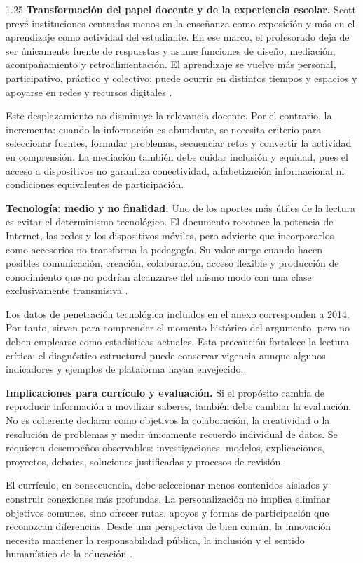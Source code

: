\documentclass[spanish,letterpaper,oneside]{article}
\begin{document}
\begin{reportelecturabox}
\begin{spacing}{1.25}
\medskip\noindent\textbf{Transformación del papel docente y de la experiencia escolar.}\enspace
Scott prevé instituciones centradas menos en la enseñanza como exposición y más en el aprendizaje como actividad del estudiante. En ese marco, el profesorado deja de ser únicamente fuente de respuestas y asume funciones de diseño, mediación, acompañamiento y retroalimentación. El aprendizaje se vuelve más personal, participativo, práctico y colectivo; puede ocurrir en distintos tiempos y espacios y apoyarse en redes y recursos digitales \citep{scott2015futuro}.

Este desplazamiento no disminuye la relevancia docente. Por el contrario, la incrementa: cuando la información es abundante, se necesita criterio para seleccionar fuentes, formular problemas, secuenciar retos y convertir la actividad en comprensión. La mediación también debe cuidar inclusión y equidad, pues el acceso a dispositivos no garantiza conectividad, alfabetización informacional ni condiciones equivalentes de participación.

\medskip\noindent\textbf{Tecnología: medio y no finalidad.}\enspace
Uno de los aportes más útiles de la lectura es evitar el determinismo tecnológico. El documento reconoce la potencia de Internet, las redes y los dispositivos móviles, pero advierte que incorporarlos como accesorios no transforma la pedagogía. Su valor surge cuando hacen posibles comunicación, creación, colaboración, acceso flexible y producción de conocimiento que no podrían alcanzarse del mismo modo con una clase exclusivamente transmisiva \citep{scott2015futuro}.

Los datos de penetración tecnológica incluidos en el anexo corresponden a 2014. Por tanto, sirven para comprender el momento histórico del argumento, pero no deben emplearse como estadísticas actuales. Esta precaución fortalece la lectura crítica: el diagnóstico estructural puede conservar vigencia aunque algunos indicadores y ejemplos de plataforma hayan envejecido.

\medskip\noindent\textbf{Implicaciones para currículo y evaluación.}\enspace
Si el propósito cambia de reproducir información a movilizar saberes, también debe cambiar la evaluación. No es coherente declarar como objetivos la colaboración, la creatividad o la resolución de problemas y medir únicamente recuerdo individual de datos. Se requieren desempeños observables: investigaciones, modelos, explicaciones, proyectos, debates, soluciones justificadas y procesos de revisión.

El currículo, en consecuencia, debe seleccionar menos contenidos aislados y construir conexiones más profundas. La personalización no implica eliminar objetivos comunes, sino ofrecer rutas, apoyos y formas de participación que reconozcan diferencias. Desde una perspectiva de bien común, la innovación necesita mantener la responsabilidad pública, la inclusión y el sentido humanístico de la educación \citep{unesco2015replantear}.

\end{spacing}
\end{reportelecturabox}
\end{document}
